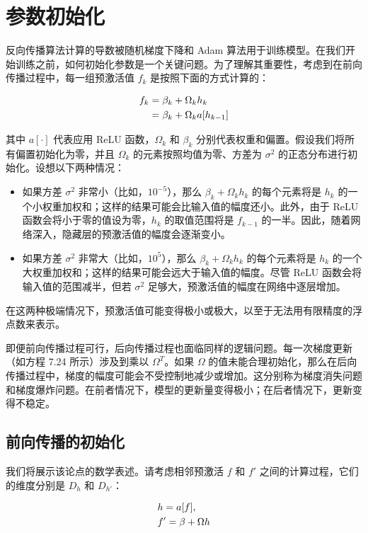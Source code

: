\section{参数初始化 }
反向传播算法计算的导数被随机梯度下降和 Adam 算法用于训练模型。在我们开始训练之前，如何初始化参数是一个关键问题。为了理解其重要性，考虑到在前向传播过程中，每一组预激活值 \(f_k\) 是按照下面的方式计算的：


\begin{align}
f_k &= \beta_k + \Omega_k h_k \notag \\
&= \beta_k + \Omega_k a[h_{k-1}] 
\end{align}


其中 \(a[\cdot]\) 代表应用 ReLU 函数，\(\Omega_k\) 和 \(\beta_k\) 分别代表权重和偏置。假设我们将所有偏置初始化为零，并且 \(\Omega_k\) 的元素按照均值为零、方差为 \(\sigma^2\) 的正态分布进行初始化。设想以下两种情况：
\begin{itemize}
    \item 如果方差 \(\sigma^2\) 非常小（比如，\(10^{-5}\)），那么 \(\beta_k + \Omega_k h_k\) 的每个元素将是 \(h_k\) 的一个小权重加权和；这样的结果可能会比输入值的幅度还小。此外，由于 ReLU 函数会将小于零的值设为零，\(h_k\) 的取值范围将是 \(f_{k-1}\) 的一半。因此，随着网络深入，隐藏层的预激活值的幅度会逐渐变小。
    \item 如果方差 \(\sigma^2\) 非常大（比如，\(10^5\)），那么 \(\beta_k + \Omega_k h_k\) 的每个元素将是 \(h_k\) 的一个大权重加权和；这样的结果可能会远大于输入值的幅度。尽管 ReLU 函数会将输入值的范围减半，但若 \(\sigma^2\) 足够大，预激活值的幅度在网络中逐层增加。
\end{itemize}


在这两种极端情况下，预激活值可能变得极小或极大，以至于无法用有限精度的浮点数来表示。

即便前向传播过程可行，后向传播过程也面临同样的逻辑问题。每一次梯度更新（如方程 7.24 所示）涉及到乘以 \(\Omega^T\)。如果 \(\Omega\) 的值未能合理初始化，那么在后向传播过程中，梯度的幅度可能会不受控制地减少或增加。这分别称为梯度消失问题和梯度爆炸问题。在前者情况下，模型的更新量变得极小；在后者情况下，更新变得不稳定。

\subsection{前向传播的初始化}
我们将展示该论点的数学表述。请考虑相邻预激活 \(f\) 和 \(f'\) 之间的计算过程，它们的维度分别是 \(D_h\) 和 \(D_{h'}\)：


\begin{align}
&h = a[f], \notag \\
&f' = \beta + \Omega h 
\end{align} 


